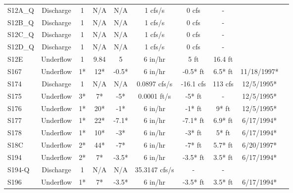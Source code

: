 \begin{table}[h]
\begin{tabular}{@{}lccccccccc@{}}
{S12A\_Q}       & Discharge     & 1        & N/A         & N/A          & 1 cfs/s        & 0 cfs           & -       &                 \\
{S12B\_Q}       & Discharge     & 1        & N/A         & N/A          & 1 cfs/s        & 0 cfs           & -       &                 \\
{S12C\_Q}       & Discharge     & 1        & N/A         & N/A          & 1 cfs/s        & 0 cfs           & -       &                 \\
{S12D\_Q}       & Discharge     & 1        & N/A         & N/A          & 1 cfs/s        & 0 cfs           & -       &                 \\
{S12E}          & Underflow     & 1        & 9.84        & 5            & 6 in/hr        & 5 ft            & 16.4 ft &                 \\
{S167}          & Underflow     & 1*       & 12*         & -0.5*        & 6 in/hr        & -0.5* ft        & 6.5* ft & 11/18/1997*     \\
{S174}          & Discharge     & 1        & N/A         & N/A          & 0.0897 cfs/s   & -16.1 cfs       & 113 cfs & 12/5/1995*      \\
{S175}          & Underflow     & 3*       & 7*          & -5*          & 0.0001 ft/s    & -5* ft          & -       & 12/5/1995*      \\
{S176}          & Underflow     & 1*       & 20*         & -1*          & 6 in/hr        & -1* ft          & 9* ft   & 12/5/1995*      \\
{S177}          & Underflow     & 1*       & 22*         & -7.1*        & 6 in/hr        & -7.1* ft        & 6.9* ft & 6/17/1994*      \\
{S178}          & Underflow     & 1*       & 10*         & -3*          & 6 in/hr        & -3* ft          & 5* ft   & 6/17/1994*      \\
{S18C}          & Underflow     & 2*       & 44*         & -7*          & 6 in/hr        & -7* ft          & 5.7* ft & 6/20/1997*      \\
{S194}          & Underflow     & 2*       & 7*          & -3.5*        & 6 in/hr        & -3.5* ft        & 3.5* ft & 6/17/1994*      \\
{S194-Q}        & Discharge     & 1        & N/A         & N/A          & 35.3147 cfs/s  & -               & -       &                 \\
{S196}          & Underflow     & 1*       & 7*          & -3.5*        & 6 in/hr        & -3.5* ft        & 3.5* ft & 6/17/1994*      \\

\end{tabular}
\end{table}

